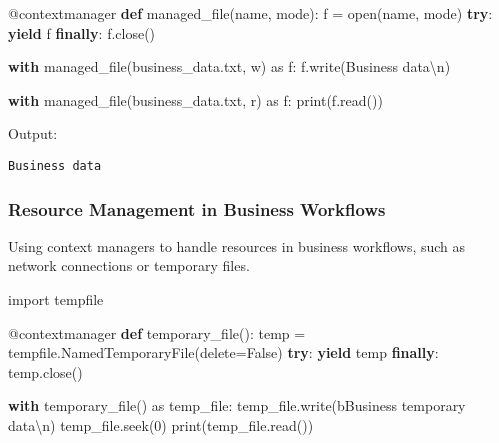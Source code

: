 \documentclass[
  letterpaper,
  DIV=11,
  numbers=noendperiod]{scrreprt}
\newenvironment{Shaded}{\begin{snugshade}}{\end{snugshade}}
\newcommand{\AttributeTok}[1]{\textcolor[rgb]{0.40,0.45,0.13}{#1}}
\newcommand{\BuiltInTok}[1]{\textcolor[rgb]{0.00,0.23,0.31}{#1}}
\newcommand{\CharTok}[1]{\textcolor[rgb]{0.13,0.47,0.30}{#1}}
\newcommand{\ControlFlowTok}[1]{\textcolor[rgb]{0.00,0.23,0.31}{\textbf{#1}}}
\newcommand{\DecValTok}[1]{\textcolor[rgb]{0.68,0.00,0.00}{#1}}
\newcommand{\ImportTok}[1]{\textcolor[rgb]{0.00,0.46,0.62}{#1}}
\newcommand{\KeywordTok}[1]{\textcolor[rgb]{0.00,0.23,0.31}{\textbf{#1}}}
\newcommand{\NormalTok}[1]{\textcolor[rgb]{0.00,0.23,0.31}{#1}}
\newcommand{\OperatorTok}[1]{\textcolor[rgb]{0.37,0.37,0.37}{#1}}
\newcommand{\StringTok}[1]{\textcolor[rgb]{0.13,0.47,0.30}{#1}}
\newcommand{\VariableTok}[1]{\textcolor[rgb]{0.07,0.07,0.07}{#1}}
\begin{document}
\begin{Shaded}
\begin{Highlighting}[]
\AttributeTok{@contextmanager}
\KeywordTok{def}\NormalTok{ managed\_file(name, mode):}
\NormalTok{    f }\OperatorTok{=} \BuiltInTok{open}\NormalTok{(name, mode)}
    \ControlFlowTok{try}\NormalTok{:}
        \ControlFlowTok{yield}\NormalTok{ f}
    \ControlFlowTok{finally}\NormalTok{:}
\NormalTok{        f.close()}

\ControlFlowTok{with}\NormalTok{ managed\_file(}\StringTok{\textquotesingle{}business\_data.txt\textquotesingle{}}\NormalTok{, }\StringTok{\textquotesingle{}w\textquotesingle{}}\NormalTok{) }\ImportTok{as}\NormalTok{ f:}
\NormalTok{    f.write(}\StringTok{\textquotesingle{}Business data}\CharTok{\textbackslash{}n}\StringTok{\textquotesingle{}}\NormalTok{)}

\ControlFlowTok{with}\NormalTok{ managed\_file(}\StringTok{\textquotesingle{}business\_data.txt\textquotesingle{}}\NormalTok{, }\StringTok{\textquotesingle{}r\textquotesingle{}}\NormalTok{) }\ImportTok{as}\NormalTok{ f:}
    \BuiltInTok{print}\NormalTok{(f.read())}
\end{Highlighting}
\end{Shaded}

Output:

\begin{verbatim}
Business data
\end{verbatim}

\subsubsection{Resource Management in Business
Workflows}\label{resource-management-in-business-workflows}

Using context managers to handle resources in business workflows, such
as network connections or temporary files.

\begin{Shaded}
\begin{Highlighting}[]
\ImportTok{import}\NormalTok{ tempfile}

\AttributeTok{@contextmanager}
\KeywordTok{def}\NormalTok{ temporary\_file():}
\NormalTok{    temp }\OperatorTok{=}\NormalTok{ tempfile.NamedTemporaryFile(delete}\OperatorTok{=}\VariableTok{False}\NormalTok{)}
    \ControlFlowTok{try}\NormalTok{:}
        \ControlFlowTok{yield}\NormalTok{ temp}
    \ControlFlowTok{finally}\NormalTok{:}
\NormalTok{        temp.close()}

\ControlFlowTok{with}\NormalTok{ temporary\_file() }\ImportTok{as}\NormalTok{ temp\_file:}
\NormalTok{    temp\_file.write(}\StringTok{b\textquotesingle{}Business temporary data}\CharTok{\textbackslash{}n}\StringTok{\textquotesingle{}}\NormalTok{)}
\NormalTok{    temp\_file.seek(}\DecValTok{0}\NormalTok{)}
    \BuiltInTok{print}\NormalTok{(temp\_file.read())}
\end{Highlighting}
\end{Shaded}
\end{document}
